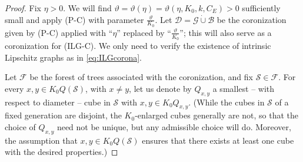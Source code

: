 \documentclass[12pt]{amsart}
\renewcommand{\theta}{\vartheta}
\numberwithin{equation}{section}
\theoremstyle{plain}
\theoremstyle{definition}
\theoremstyle{remark}
\begin{document}
\begin{proof}
Fix $\eta>0$. We will find $\theta=\theta(\eta)=\theta(\eta,K_0,k,C_E)>0$ sufficiently small and apply (P-C) with parameter $\frac{\theta}{K_0}$. 
Let $\mathcal{D}=\mathcal{G}\dot{\cup}\mathcal{B}$ be the coronization given by (P-C) applied with ``$\eta$'' replaced by ``$\frac{\theta}{K_0}$''; this will also serve as a coronization for (ILG-C). We only need to verify the existence of intrinsic Lipschitz graphs as in \eqref{eq:ILGcorona}.

Let $\mathcal{F}$ be the forest of trees associated with the coronization, and fix $\mathcal S\in\mathcal F$. For every $x,y\in K_0Q(\mathcal S)$, with $x\neq y$, let us denote by $Q_{x,y}$ a smallest -- with respect to diameter -- cube 
in $\mathcal{S}$ 
with $x,y\in K_0 Q_{x,y}$. (While the cubes in $\mathcal{S}$ of a fixed generation are disjoint, the $K_0$-enlarged cubes generally are not, so that the choice of $Q_{x,y}$ need not be unique, but any admissible choice will do. Moreover, the assumption that $x,y\in K_0 Q(\mathcal{S})$ ensures that there exists at least one cube with the desired properties.)


\end{proof}
\end{document}
